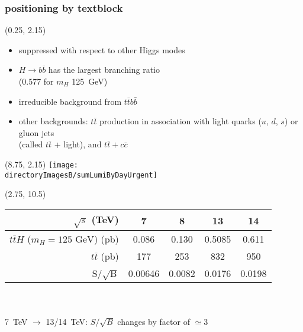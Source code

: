 \begin{frame}
\frametitle{positioning by textblock}
\vspace{-7 cm}
\small
\begin{textblock}{8}(0.25, 2.15) %
\begin{itemize}
\item suppressed with respect to other Higgs modes
\item ${H\to b\bar{b}}$ has the largest branching ratio\\(0.577 for ${m_{H}}$ 125~GeV)
\item irreducible background from ${t\bar{t}b\bar{b}}$
\item other backgrounds: ${t\bar{t}}$ production in association with light quarks (${u}$, ${d}$, ${s}$) or gluon jets\\(called ${t\bar{t}}$ + light), and ${t\bar{t}+c\bar{c}}$
\end{itemize}
\end{textblock}
\begin{textblock}{8}(8.75, 2.15) %
\texttt{[image: \\directoryImagesB/sumLumiByDayUrgent]}
\end{textblock}
\begin{textblock}{8}(2.75, 10.5) %
\begin{centering}
\begin{tabular}{r|c|c|c|c}
    ${\sqrt{s}}$ (TeV) & 7 & 8 & 13 & 14 \\
    \hline
    ${t\bar{t}H}$ (${m_{H}=125\textrm{ GeV}}$) (pb) & 0.086 & 0.130 & 0.5085 & 0.611 \\
    ${t\bar{t}}$ (pb) & 177 & 253 & 832 & 950 \\
    \hline
    S/${\sqrt{\textrm{B}}}$ & 0.00646 & 0.0082 & 0.0176 & 0.0198 \\
\end{tabular}
\end{centering}
\mbox{}\\
\mbox{}\\
\tiny
7~TeV ${\to}$ 13/14~TeV: ${S/\sqrt{B}}$ changes by factor of ${\simeq}$3
\end{textblock}
\end{frame}

